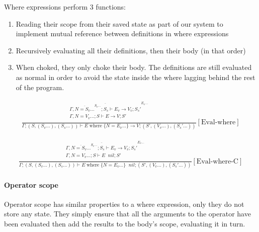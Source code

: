 \documentclass{scrartcl}
\DeclareMathOperator{\where}{where}
\DeclareMathOperator{\ceval}{\overset{C}{\rightarrow}}
\begin{document}
    Where expressions perform 3 functions:
    
    \begin{enumerate}
        \item Reading their scope from their saved state as part of our system to implement mutual reference between definitions in where expressions
        \item Recursively evaluating all their definitions, then their body (in that order)
        \item When choked, they only choke their body. The definitions are still evaluated as normal in order to avoid the state inside the where lagging behind the rest of the program.
    \end{enumerate}
    
    \begin{align*}
    \frac{
        \begin{matrix}
        \overline{\Gamma, \overline{N=S_v...}^{S_v...}; S_s \vdash E_v \rightarrow V_v; S_s'}^{E_v...} \\
        \Gamma, N=V_v...; S \vdash E \rightarrow V; S' \\
        \end{matrix}
    }{
        \Gamma; (S, (S_v...), (S_s...)) \vdash E \where \{ N=E_v... \} \rightarrow V; (S', (V_v...), (S_s'...))
    }[\text{Eval-where}]
    \end{align*}
    
    \begin{align*}
    \frac{
        \begin{matrix}
        \overline{\Gamma, \overline{N=S_v...}^{S_v...}; S_s \vdash E_v \rightarrow V_v; S_s'}^{E_v...} \\
        \Gamma, N=V_v...; S \vdash E \ceval nil; S' \\
        \end{matrix}
    }{
        \Gamma; (S, (S_v...), (S_s...)) \vdash E \where \{ N=E_v... \} \ceval nil; (S', (V_v...), (S_s'...))
    }[\text{Eval-where-C}]
    \end{align*}
    
    \paragraph{Operator scope}
    
    Operator scope has similar properties to a where expression, only they do not store any state. They simply ensure that all the arguments to the operator have been evaluated then add the results to the body's scope, evaluating it in turn.
    
\end{document}
